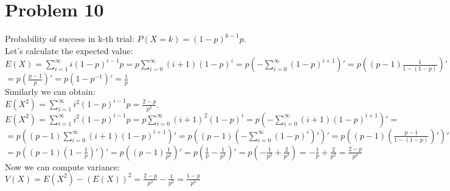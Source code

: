 \documentclass[11pt,wide]{article}
\begin{document}
\section{Problem 10\textdegree}
Probability of success in k-th trial:
\(P(X=k) = (1-p)^{k-1} p  \). \\
Let's calculate the expected value: \\
\(\displaystyle E(X) = \sum_{i=1}^{\infty} i(1-p)^{i-1}p = p \sum_{i=0}^\infty (i+1)(1-p)^i =
p(-\sum_{i=0}^\infty (1-p)^{i+1})' = p((p-1)\frac{1}{1-(1-p)})' =  \) \\
\(\displaystyle = p(\frac{p-1}{p})' = p(1-p^{-1})' = \frac{1}{p}  \) \\
Similarly we can obtain: \\
\(\displaystyle E(X^2) = \sum_{i=1}^{\infty} i^2(1-p)^{i-1}p = \frac{2-p}{p^2} \).\\
\(\displaystyle E(X^2) = \sum_{i=1}^{\infty} i^2(1-p)^{i-1}p = p\sum_{i=0}^{\infty} (i+1)^2(1-p)^{i} = 
p(-\sum_{i=0}^{\infty} (i+1)(1-p)^{i+1})' = \) \\
\(\displaystyle = p\left((p-1)\sum_{i=0}^{\infty} (i+1)(1-p)^{i+1}\right)' = p\left((p-1) \left( -\sum_{i=0}^{\infty} (1-p)^{i}\right) '\right) ' = p\left((p-1) \left( \frac{p-1}{1-(1-p)}\right) '\right) ' =  \)\\
\(\displaystyle = p\left((p-1) \left( 1 - \frac{1}{p} \right) '\right) ' =  
p\left((p-1) \frac{1}{p^2} \right) ' = p\left(\frac{1}{p} - \frac{1}{p^2} \right) ' = 
p\left(- \frac{1}{p^2} + \frac{2}{p^3} \right) = - \frac{1}{p} + \frac{2}{p^2} = \frac{2-p}{p^2} \) \\
Now we can compute variance:\\
\(\displaystyle V(X) = E(X^2) - (E(X))^2 = \frac{2-p}{p^2} - \frac{1}{p^2} = \frac{1-p}{p^2} \)\\
\end{document}
